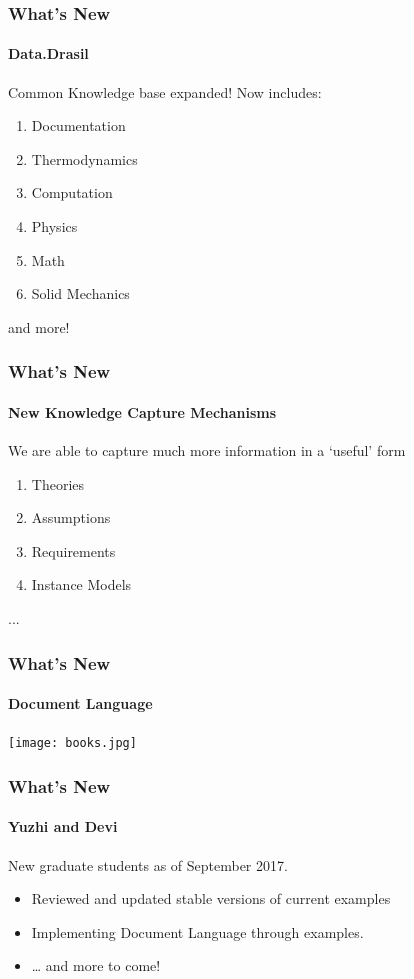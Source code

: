 \documentclass{beamer}
\begin{document}
\begin{frame}

\frametitle{What's New}

\framesubtitle{Data.Drasil}

Common Knowledge base expanded! Now includes:
\begin{enumerate}
\item Documentation
\item Thermodynamics 
\item Computation
\item Physics
\item Math
\item Solid Mechanics
\end{enumerate}
and more!

\end{frame}


\begin{frame}

\frametitle{What's New}
\framesubtitle{New Knowledge Capture Mechanisms}

We are able to capture much more information in a `useful' form

\begin{enumerate}
	\item Theories
	\item Assumptions
	\item Requirements
	\item Instance Models
\end{enumerate}
...

\end{frame}


\begin{frame}

\frametitle{What's New}
\framesubtitle{Document Language}

\begin{center}
\texttt{[image: books.jpg]}
\end{center}

\end{frame}


\begin{frame}

\frametitle{What's New}
\framesubtitle{Yuzhi and Devi}

New graduate students as of September 2017.

\begin{itemize}
\item Reviewed and updated stable versions of current examples
\item Implementing Document Language through examples.
\item \ldots{} and more to come!
\end{itemize}

\end{frame}
\end{document}
